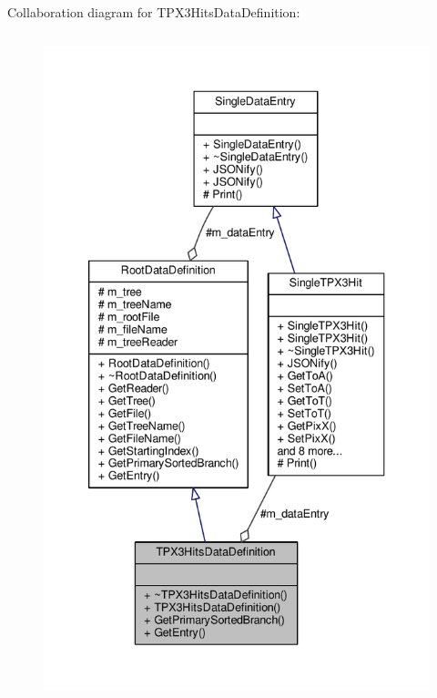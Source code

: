 Collaboration diagram for T\+P\+X3\+Hits\+Data\+Definition\+:\nopagebreak
\begin{figure}[H]
\begin{center}
\leavevmode
\includegraphics[height=550pt]{classTPX3HitsDataDefinition__coll__graph}
\end{center}
\end{figure}
